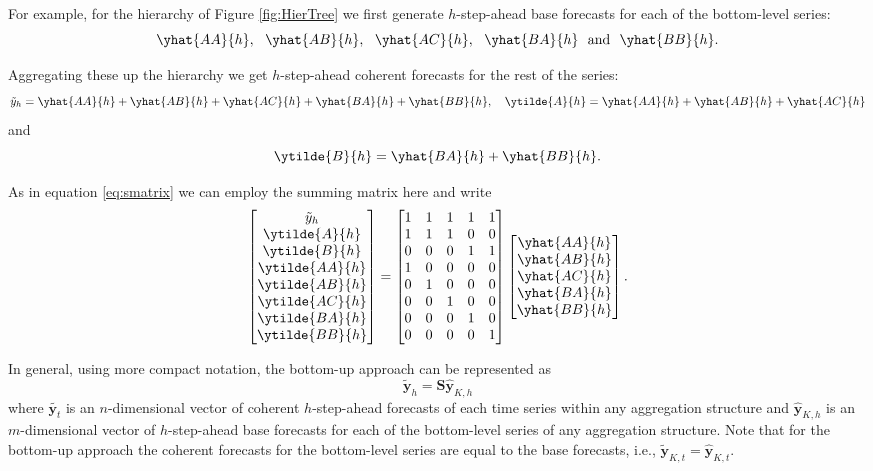 \documentclass[]{book}
\begin{document}
For example, for the hierarchy of Figure \ref{fig:HierTree} we first generate \(h\)-step-ahead base forecasts for each of the bottom-level series: \[\yhat{AA}{h},~~\yhat{AB}{h},~~\yhat{AC}{h},~~ \yhat{BA}{h}~~\text{and}~~\yhat{BB}{h}.\]

Aggregating these up the hierarchy we get \(h\)-step-ahead coherent forecasts for the rest of the series: \[\tilde{y}_{h}=\yhat{AA}{h}+\yhat{AB}{h}+\yhat{AC}{h}+\yhat{BA}{h}+\yhat{BB}{h},~~~\ytilde{A}{h}= \yhat{AA}{h}+\yhat{AB}{h}+\yhat{AC}{h}\] and \[\ytilde{B}{h}= \yhat{BA}{h}+\yhat{BB}{h}.\]

As in equation \eqref{eq:smatrix} we can employ the summing matrix here and write
\[
  \begin{bmatrix}
    \tilde{y}_{h} \\
    \ytilde{A}{h} \\
    \ytilde{B}{h} \\
    \ytilde{AA}{h} \\
    \ytilde{AB}{h} \\
    \ytilde{AC}{h} \\
    \ytilde{BA}{h} \\
    \ytilde{BB}{h}
  \end{bmatrix}
  =
  \begin{bmatrix}
    1 & 1 & 1 & 1 & 1 \\
    1 & 1 & 1 & 0 & 0 \\
    0 & 0 & 0 & 1 & 1 \\
    1  & 0  & 0  & 0  & 0  \\
    0  & 1  & 0  & 0  & 0  \\
    0  & 0  & 1  & 0  & 0  \\
    0  & 0  & 0  & 1  & 0  \\
    0  & 0  & 0  & 0  & 1
  \end{bmatrix}
  \begin{bmatrix}
    \yhat{AA}{h} \\
    \yhat{AB}{h} \\
    \yhat{AC}{h} \\
    \yhat{BA}{h} \\
    \yhat{BB}{h}
  \end{bmatrix}.
\]

In general, using more compact notation, the bottom-up approach can be represented as
\[
  \tilde{\bm{y}}_{h}=\bm{S}\hat{\bm{y}}_{K,h}
\]
where \(\tilde{\bm{y}_t}\) is an \(n\)-dimensional vector of coherent \(h\)-step-ahead forecasts of each time series within any aggregation structure and \(\hat{\bm{y}}_{K,h}\) is an \(m\)-dimensional vector of \(h\)-step-ahead base forecasts for each of the bottom-level series of any aggregation structure. Note that for the bottom-up approach the coherent forecasts for the bottom-level series are equal to the base forecasts, i.e., \(\tilde{\bm{y}}_{K,t}=\hat{\bm{y}}_{K,t}\).
\end{document}

